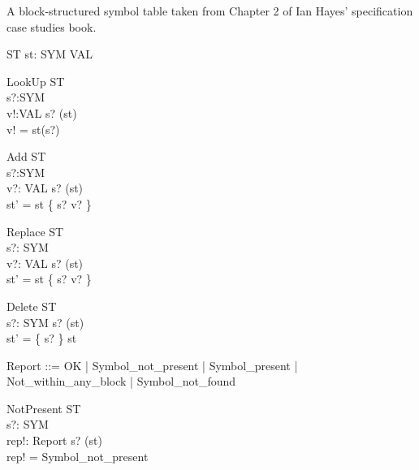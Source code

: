 A block-structured symbol table taken from Chapter 2
of Ian Hayes' specification case studies book.

\begin{zed}
\end{zed}

\begin{schema}{ST}
 st: SYM \pfun VAL \\
\end{schema}

\begin{schema}{LookUp}
  \Xi ST \\
  s?:SYM \\
  v!:VAL
\where
  s? \in \dom(st) \\
  v! = st(s?)
\end{schema}

\begin{schema}{Add}
  \Delta ST \\
  s?:SYM \\
  v?: VAL
\where
  s? \notin \dom(st) \\
  st' = st \cup \{ s? \mapsto v? \}
\end{schema}

\begin{schema}{Replace}
  \Delta ST \\
  s?: SYM \\
  v?: VAL
\where
  s? \in \dom(st) \\
  st' = st \oplus \{ s? \mapsto v? \}
\end{schema}

\begin{schema}{Delete}
  \Delta ST \\
  s?: SYM
\where
  s? \in \dom(st) \\
  st' = \{ s? \} \ndres st
\end{schema}


\begin{zed}
  Report ::= OK
                  | Symbol\_not\_present
		  | Symbol\_present
		  | Not\_within\_any\_block
		  | Symbol\_not\_found
\end{zed}

\begin{schema}{NotPresent}
  \Xi ST \\
  s?: SYM \\
  rep!: Report
\where
  s? \notin \dom(st) \\
  rep! = Symbol\_not\_present
\end{schema}

